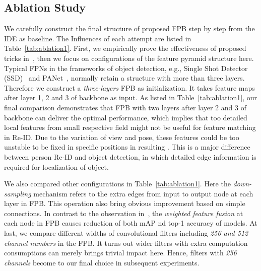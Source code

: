 \documentclass[journal]{IEEEtran}
\begin{document}
\subsection{Ablation Study}
\label{sec:ablation}
We carefully construct the final structure of proposed FPB step by step from the IDE as baseline.
The Influences of each attempt are listed in Table~\ref{tab:ablation1}.
First, we empirically prove the effectiveness of proposed tricks in~\cite{luo2019bag}, then we focus on configurations of the feature pyramid structure here.
Typical FPNs in the frameworks of object detection, e.g., Single Shot Detector (SSD)~\cite{978-3-319-46448-02} and PANet~\cite{8579011}, normally retain a structure with more than three layers.
Therefore we construct a \textit{three-layers} FPB as initialization.
It takes feature maps after layer 1, 2 and 3 of backbone as input.
As listed in Table~\ref{tab:ablation1}, our final comparison demonstrates that FPB with two layers after layer 2 and 3 of backbone can deliver the optimal performance, which implies that too detailed local features from small respective field might not be useful for feature matching in Re-ID.
Due to the variation of view and pose, these features could be too unstable to be fixed in specific positions in resulting .
This is a major difference between person Re-ID and object detection, in which detailed edge information is required for localization of object.

We also compared other configurations in Table~\ref{tab:ablation1}.
Here the \textit{down-sampling} mechanism refers to the extra edges from input to output node at each layer in FPB.
This operation also bring obvious improvement based on simple connections.
In contrast to the observation in~\cite{9156454}, the \textit{weighted feature fusion} at each node in FPB causes reduction of both mAP nd top-1 accuracy of models.
At last, we compare different widths of convolutional filters including \textit{256 and 512 channel numbers} in the FPB.
It turns out wider filters with extra computation consumptions can merely brings trivial impact here.
Hence, filters with \textit{256 channels} become to our final choice in subsequent experiments.
\end{document}
